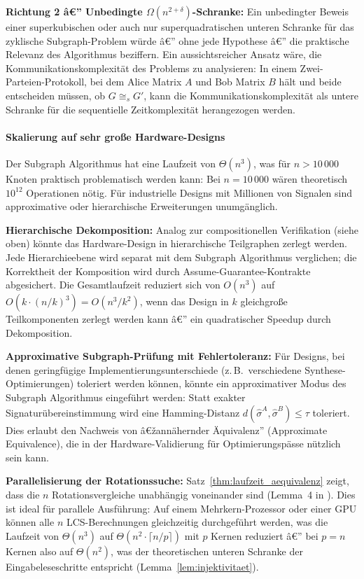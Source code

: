 ﻿\documentclass[12pt,a4paper]{report}
\begin{document}
\textbf{Richtung 2 â€” Unbedingte $\Omega(n^{2+\delta})$-Schranke:}
Ein unbedingter Beweis einer superkubischen oder auch nur superquadratischen unteren
Schranke für das zyklische Subgraph-Problem würde â€” ohne jede Hypothese â€” die praktische
Relevanz des Algorithmus beziffern. Ein aussichtsreicher Ansatz wäre, die
Kommunikationskomplexität des Problems zu analysieren: In einem Zwei-Parteien-Protokoll,
bei dem Alice Matrix $A$ und Bob Matrix $B$ hält und beide entscheiden müssen, ob
$G \cong_s G'$, kann die Kommunikationskomplexität als untere Schranke für die
sequentielle Zeitkomplexität herangezogen werden.

\paragraph{Skalierung auf sehr große Hardware-Designs}

Der Subgraph Algorithmus hat eine Laufzeit von $\Theta(n^3)$, was für $n > 10\,000$
Knoten praktisch problematisch werden kann: Bei $n = 10\,000$ wären theoretisch
$10^{12}$ Operationen nötig. Für industrielle Designs mit Millionen von Signalen
sind approximative oder hierarchische Erweiterungen unumgänglich.

\textbf{Hierarchische Dekomposition:} Analog zur compositionellen Verifikation (siehe
oben) könnte das Hardware-Design in hierarchische Teilgraphen zerlegt werden.
Jede Hierarchieebene wird separat mit dem Subgraph Algorithmus verglichen; die
Korrektheit der Komposition wird durch Assume-Guarantee-Kontrakte abgesichert. Die
Gesamtlaufzeit reduziert sich von $O(n^3)$ auf $O(k \cdot (n/k)^3) = O(n^3 / k^2)$,
wenn das Design in $k$ gleichgroße Teilkomponenten zerlegt werden kann â€” ein quadratischer
Speedup durch Dekomposition.

\textbf{Approximative Subgraph-Prüfung mit Fehlertoleranz:} Für Designs, bei denen
geringfügige Implementierungsunterschiede (z.\,B.\ verschiedene Synthese-Optimierungen)
toleriert werden können, könnte ein approximativer Modus des Subgraph Algorithmus
eingeführt werden: Statt exakter Signaturübereinstimmung wird eine Hamming-Distanz
$d(\hat{\sigma}^A, \hat{\sigma}^B) \leq \tau$ toleriert. Dies erlaubt den Nachweis
von â€žannähernder Äquivalenz'' (Approximate Equivalence), die in der
Hardware-Validierung für Optimierungspässe nützlich sein kann.

\textbf{Parallelisierung der Rotationssuche:} Satz~\ref{thm:laufzeit_aequivalenz} zeigt,
dass die $n$ Rotationsvergleiche unabhängig voneinander sind (Lemma~4 in \cite{subgraph2026}).
Dies ist ideal für parallele Ausführung: Auf einem Mehrkern-Prozessor oder einer GPU
können alle $n$ LCS-Berechnungen gleichzeitig durchgeführt werden, was die
Laufzeit von $\Theta(n^3)$ auf $\Theta(n^2 \cdot \lceil n / p \rceil)$ mit $p$ Kernen
reduziert â€” bei $p = n$ Kernen also auf $\Theta(n^2)$, was der theoretischen unteren
Schranke der Eingabeleseschritte entspricht (Lemma~\ref{lem:injektivitaet}).
\end{document}
